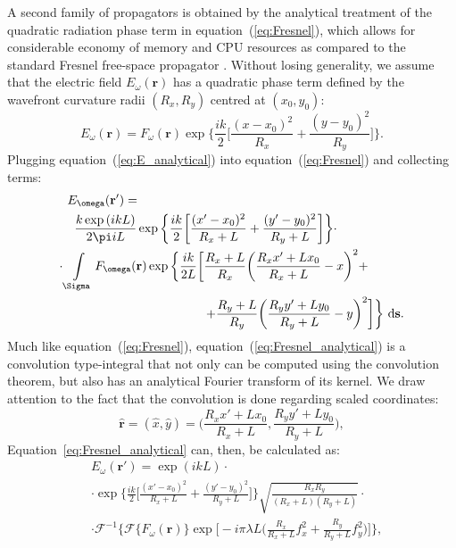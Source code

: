 \documentclass{iucr}              %
\begin{document}
A second family of propagators is obtained by the analytical treatment of the quadratic radiation phase term in equation~(\ref{eq:Fresnel}), which allows for considerable economy of memory and CPU resources as compared to the standard Fresnel free-space propagator \cite{ChubarCelestre}. Without losing generality, we assume that the electric field $E_\omega(\textbf{r})$ has a quadratic phase term defined by the wavefront curvature radii $(R_x, R_y)$ centred at $(x_0,y_0)$:
 \begin{equation}\label{eq:E_analytical}
    E_\omega(\textbf{r}) = F_\omega(\textbf{r})\exp\bigg\{ \frac{ik}{2}\bigg[ \frac{(x-x_0)^2}{R_x} + \frac{(y-y_0)^2}{R_y} \bigg]\bigg\}.
\end{equation}
Plugging equation~(\ref{eq:E_analytical}) into equation~(\ref{eq:Fresnel}) and collecting terms:
\begin{equation}\label{eq:Fresnel_analytical}
\begin{split}
    E_\omega(\textbf{r}') = \qquad\qquad\qquad\qquad\qquad\qquad\qquad\qquad\qquad\quad &\\
    \frac{k\exp{(ikL)}}{2\pi i L}\exp\bigg\{ \frac{ik}{2}\bigg[ \frac{(x'-x_0)^2}{R_x+L} + \frac{(y'-y_0)^2}{R_y+L} \bigg] \bigg\}\cdot \qquad\quad &\\
    \cdot\int\limits_{\Sigma}{F_\omega(\textbf{r})\exp{\bigg\{ \frac{ik}{2L}\bigg[ \frac{R_x+L}{R_x}\bigg(\frac{R_xx'+Lx_0}{R_x+L}-x\bigg)^2+}} \enspace\\
    \hfill+ \frac{R_y+L}{R_y}\bigg(\frac{R_yy'+Ly_0}{R_y+L}-y\bigg)^2\bigg] & \bigg\}~\mathrm{d}\textbf{s}.
\end{split}
\end{equation}
Much like equation~(\ref{eq:Fresnel}), equation~(\ref{eq:Fresnel_analytical}) is a convolution type-integral that not only can be computed using the convolution theorem, but also has an analytical Fourier transform of its kernel. We draw attention to the fact that the convolution is done regarding scaled coordinates:
\begin{equation}\label{eq:coordinates}
\hat{\textbf{r}}=(\hat{x},\hat{y})=\bigg(\frac{R_xx'+Lx_0}{R_x+L}, \frac{R_yy'+Ly_0}{R_y+L}\bigg),
\end{equation}
Equation~\ref{eq:Fresnel_analytical} can, then, be calculated as:
\begin{equation}\label{eq:Fresnel_analyticalConv}
\begin{split}
&E_\omega(\textbf{r}') =\exp{(ikL)}\cdot\\
&\cdot\exp\bigg\{ \frac{ik}{2}\bigg[ \frac{(x'-x_0)^2}{R_x+L} + \frac{(y'-y_0)^2}{R_y+L} \bigg] \bigg\}\sqrt{\frac{R_xR_y}{(R_x+L)(R_y+L)}}\cdot\\
&\cdot\mathcal{F}^{-1}\bigg\{\mathcal{F}\{F_\omega(\textbf{r})\}\exp\bigg[-i\pi\lambda L\bigg(\frac{R_x}{R_x+L}f_x^2 +\frac{R_y}{R_y+L}f_y^2\bigg)\bigg]\bigg\},
\end{split}
\end{equation}
\end{document}
